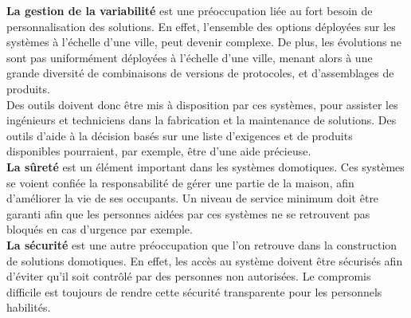 {\bf La gestion de la variabilité} est une préoccupation liée au fort besoin de personnalisation des solutions. En effet, l'ensemble des options déployées sur les systèmes à l'échelle d'une ville, peut devenir complexe. De plus, les évolutions ne sont pas uniformément déployées à l'échelle d'une ville, menant alors à une grande diversité de combinaisons de versions de protocoles, et d'assemblages de produits.\\
Des outils doivent donc être mis à disposition par ces systèmes, pour assister les ingénieurs et techniciens dans la fabrication et la maintenance de solutions. Des outils d'aide à la décision basés sur une liste d'exigences et de produits disponibles pourraient, par exemple, être d'une aide précieuse.\\










{\bf La sûreté} est un élément important dans les systèmes domotiques. Ces systèmes se voient confiée la responsabilité de gérer une partie de la maison, afin d'améliorer la vie de ses occupants. Un niveau de service minimum doit être garanti afin que les personnes aidées par ces systèmes ne se retrouvent pas bloqués en cas d'urgence par exemple. \\

{\bf La sécurité} est une autre préoccupation que l'on retrouve dans la construction de solutions domotiques. En effet, les accès au système doivent être sécurisés afin d'éviter qu'il soit contrôlé par des personnes non autorisées. Le compromis difficile est toujours de rendre cette sécurité transparente pour les personnels habilités.\\


